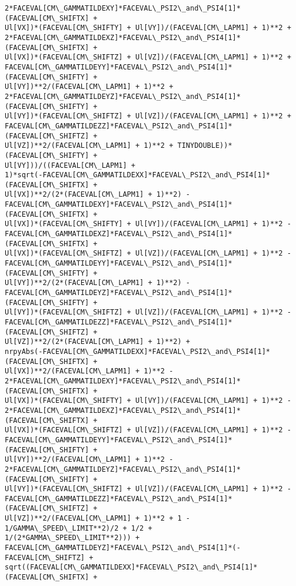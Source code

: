 \documentclass[landscape,letterpaper,10pt,english]{article}
\begin{document}
\begin{Verbatim}[commandchars=\\\{\}]
2*FACEVAL[CM\_GAMMATILDEXY]*FACEVAL\_PSI2\_and\_PSI4[1]*(FACEVAL[CM\_SHIFTX] +
Ul[VX])*(FACEVAL[CM\_SHIFTY] + Ul[VY])/(FACEVAL[CM\_LAPM1] + 1)**2 +
2*FACEVAL[CM\_GAMMATILDEXZ]*FACEVAL\_PSI2\_and\_PSI4[1]*(FACEVAL[CM\_SHIFTX] +
Ul[VX])*(FACEVAL[CM\_SHIFTZ] + Ul[VZ])/(FACEVAL[CM\_LAPM1] + 1)**2 +
FACEVAL[CM\_GAMMATILDEYY]*FACEVAL\_PSI2\_and\_PSI4[1]*(FACEVAL[CM\_SHIFTY] +
Ul[VY])**2/(FACEVAL[CM\_LAPM1] + 1)**2 +
2*FACEVAL[CM\_GAMMATILDEYZ]*FACEVAL\_PSI2\_and\_PSI4[1]*(FACEVAL[CM\_SHIFTY] +
Ul[VY])*(FACEVAL[CM\_SHIFTZ] + Ul[VZ])/(FACEVAL[CM\_LAPM1] + 1)**2 +
FACEVAL[CM\_GAMMATILDEZZ]*FACEVAL\_PSI2\_and\_PSI4[1]*(FACEVAL[CM\_SHIFTZ] +
Ul[VZ])**2/(FACEVAL[CM\_LAPM1] + 1)**2 + TINYDOUBLE))*(FACEVAL[CM\_SHIFTY] +
Ul[VY]))/((FACEVAL[CM\_LAPM1] +
1)*sqrt(-FACEVAL[CM\_GAMMATILDEXX]*FACEVAL\_PSI2\_and\_PSI4[1]*(FACEVAL[CM\_SHIFTX] +
Ul[VX])**2/(2*(FACEVAL[CM\_LAPM1] + 1)**2) -
FACEVAL[CM\_GAMMATILDEXY]*FACEVAL\_PSI2\_and\_PSI4[1]*(FACEVAL[CM\_SHIFTX] +
Ul[VX])*(FACEVAL[CM\_SHIFTY] + Ul[VY])/(FACEVAL[CM\_LAPM1] + 1)**2 -
FACEVAL[CM\_GAMMATILDEXZ]*FACEVAL\_PSI2\_and\_PSI4[1]*(FACEVAL[CM\_SHIFTX] +
Ul[VX])*(FACEVAL[CM\_SHIFTZ] + Ul[VZ])/(FACEVAL[CM\_LAPM1] + 1)**2 -
FACEVAL[CM\_GAMMATILDEYY]*FACEVAL\_PSI2\_and\_PSI4[1]*(FACEVAL[CM\_SHIFTY] +
Ul[VY])**2/(2*(FACEVAL[CM\_LAPM1] + 1)**2) -
FACEVAL[CM\_GAMMATILDEYZ]*FACEVAL\_PSI2\_and\_PSI4[1]*(FACEVAL[CM\_SHIFTY] +
Ul[VY])*(FACEVAL[CM\_SHIFTZ] + Ul[VZ])/(FACEVAL[CM\_LAPM1] + 1)**2 -
FACEVAL[CM\_GAMMATILDEZZ]*FACEVAL\_PSI2\_and\_PSI4[1]*(FACEVAL[CM\_SHIFTZ] +
Ul[VZ])**2/(2*(FACEVAL[CM\_LAPM1] + 1)**2) +
nrpyAbs(-FACEVAL[CM\_GAMMATILDEXX]*FACEVAL\_PSI2\_and\_PSI4[1]*(FACEVAL[CM\_SHIFTX] +
Ul[VX])**2/(FACEVAL[CM\_LAPM1] + 1)**2 -
2*FACEVAL[CM\_GAMMATILDEXY]*FACEVAL\_PSI2\_and\_PSI4[1]*(FACEVAL[CM\_SHIFTX] +
Ul[VX])*(FACEVAL[CM\_SHIFTY] + Ul[VY])/(FACEVAL[CM\_LAPM1] + 1)**2 -
2*FACEVAL[CM\_GAMMATILDEXZ]*FACEVAL\_PSI2\_and\_PSI4[1]*(FACEVAL[CM\_SHIFTX] +
Ul[VX])*(FACEVAL[CM\_SHIFTZ] + Ul[VZ])/(FACEVAL[CM\_LAPM1] + 1)**2 -
FACEVAL[CM\_GAMMATILDEYY]*FACEVAL\_PSI2\_and\_PSI4[1]*(FACEVAL[CM\_SHIFTY] +
Ul[VY])**2/(FACEVAL[CM\_LAPM1] + 1)**2 -
2*FACEVAL[CM\_GAMMATILDEYZ]*FACEVAL\_PSI2\_and\_PSI4[1]*(FACEVAL[CM\_SHIFTY] +
Ul[VY])*(FACEVAL[CM\_SHIFTZ] + Ul[VZ])/(FACEVAL[CM\_LAPM1] + 1)**2 -
FACEVAL[CM\_GAMMATILDEZZ]*FACEVAL\_PSI2\_and\_PSI4[1]*(FACEVAL[CM\_SHIFTZ] +
Ul[VZ])**2/(FACEVAL[CM\_LAPM1] + 1)**2 + 1 - 1/GAMMA\_SPEED\_LIMIT**2)/2 + 1/2 +
1/(2*GAMMA\_SPEED\_LIMIT**2))) +
FACEVAL[CM\_GAMMATILDEYZ]*FACEVAL\_PSI2\_and\_PSI4[1]*(-FACEVAL[CM\_SHIFTZ] +
sqrt((FACEVAL[CM\_GAMMATILDEXX]*FACEVAL\_PSI2\_and\_PSI4[1]*(FACEVAL[CM\_SHIFTX] +

\end{Verbatim}
\end{document}
